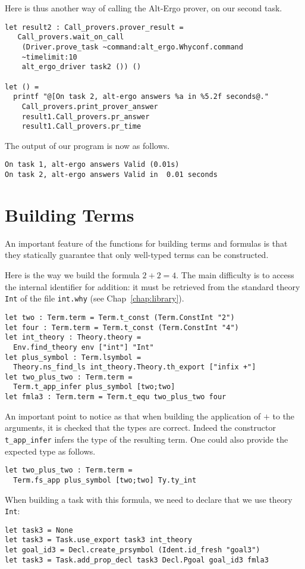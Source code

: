 Here is thus another way of calling the Alt-Ergo prover, on our second
task.
\begin{verbatim}
let result2 : Call_provers.prover_result =
   Call_provers.wait_on_call
    (Driver.prove_task ~command:alt_ergo.Whyconf.command
    ~timelimit:10
    alt_ergo_driver task2 ()) ()

let () =
  printf "@[On task 2, alt-ergo answers %a in %5.2f seconds@."
    Call_provers.print_prover_answer
    result1.Call_provers.pr_answer
    result1.Call_provers.pr_time
\end{verbatim}
The output of our program is now as follows.
\begin{verbatim}
On task 1, alt-ergo answers Valid (0.01s)
On task 2, alt-ergo answers Valid in  0.01 seconds
\end{verbatim}

\section{Building Terms}

An important feature of the functions for building terms and formulas
is that they statically guarantee that only well-typed terms can be
constructed.

Here is the way we build the formula $2+2=4$. The main difficulty is to
access the internal identifier for addition: it must be retrieved from
the standard theory \texttt{Int} of the file \texttt{int.why} (see
Chap~\ref{chap:library}).
\begin{verbatim}
let two : Term.term = Term.t_const (Term.ConstInt "2")
let four : Term.term = Term.t_const (Term.ConstInt "4")
let int_theory : Theory.theory =
  Env.find_theory env ["int"] "Int"
let plus_symbol : Term.lsymbol =
  Theory.ns_find_ls int_theory.Theory.th_export ["infix +"]
let two_plus_two : Term.term =
  Term.t_app_infer plus_symbol [two;two]
let fmla3 : Term.term = Term.t_equ two_plus_two four
\end{verbatim}
An important point to notice as that when building the application of
$+$ to the arguments, it is checked that the types are correct. Indeed
the constructor \texttt{t\_app\_infer} infers the type of the resulting
term. One could also provide the expected type as follows.
\begin{verbatim}
let two_plus_two : Term.term =
  Term.fs_app plus_symbol [two;two] Ty.ty_int
\end{verbatim}

When building a task with this formula, we need to declare that we use
theory \texttt{Int}:
\begin{verbatim}
let task3 = None
let task3 = Task.use_export task3 int_theory
let goal_id3 = Decl.create_prsymbol (Ident.id_fresh "goal3")
let task3 = Task.add_prop_decl task3 Decl.Pgoal goal_id3 fmla3
\end{verbatim}

